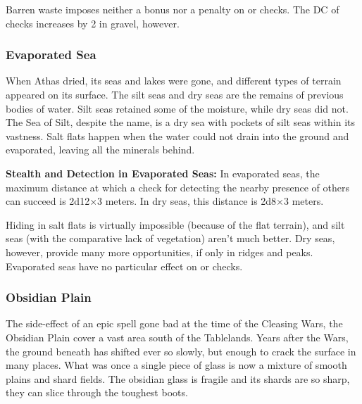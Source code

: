 Barren waste imposes neither a bonus nor a penalty on  or  checks. The DC of  checks increases by 2 in gravel, however.


\subsubsection{Evaporated Sea}
When Athas dried, its seas and lakes were gone, and different types of terrain appeared on its surface. The silt seas and dry seas are the remains of previous bodies of water. Silt seas retained some of the moisture, while dry seas did not. The Sea of Silt, despite the name, is a dry sea with pockets of silt seas within its vastness. Salt flats happen when the water could not drain into the ground and evaporated, leaving all the minerals behind.


\textbf{Stealth and Detection in Evaporated Seas:} In evaporated seas, the maximum distance at which a  check for detecting the nearby presence of others can succeed is 2d12$\times$3 meters. In dry seas, this distance is 2d8$\times$3 meters.

Hiding in salt flats is virtually impossible (because of the flat terrain), and silt seas (with the comparative lack of vegetation) aren’t much better. Dry seas, however, provide many more opportunities, if only in ridges and peaks. Evaporated seas have no particular effect on  or  checks.

\subsubsection{Obsidian Plain}
The side-effect of an epic spell gone bad at the time of the Cleasing Wars, the Obsidian Plain cover a vast area south of the Tablelands. Years after the Wars, the ground beneath has shifted ever so slowly, but enough to crack the surface in many places. What was once a single piece of glass is now a mixture of smooth plains and shard fields. The obsidian glass is fragile and its shards are so sharp, they can slice through the toughest boots. 

